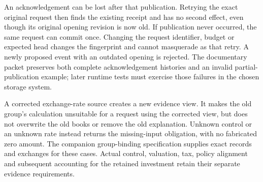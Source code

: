 An acknowledgement can be lost after that publication. Retrying the exact
original request then finds the existing receipt and has no second effect,
even though its original opening revision is now old. If publication never
occurred, the same request can commit once. Changing the request identifier,
budget or expected head changes the fingerprint and cannot masquerade as
that retry. A newly proposed event with an outdated opening is rejected.
The documentary packet preserves both complete acknowledgement histories
and an invalid partial-publication example; later runtime tests must exercise
those failures in the chosen storage system.

A corrected exchange-rate source creates a new evidence view. It makes the
old group's calculation unsuitable for a request using the corrected view,
but does not overwrite the old books or remove the old explanation.
Unknown control or an unknown rate instead returns the missing-input
obligation, with no fabricated zero amount. The companion group-binding
specification supplies exact records and exchanges for these cases.
Actual control, valuation, tax, policy alignment and subsequent accounting
for the retained investment retain their separate evidence requirements.
